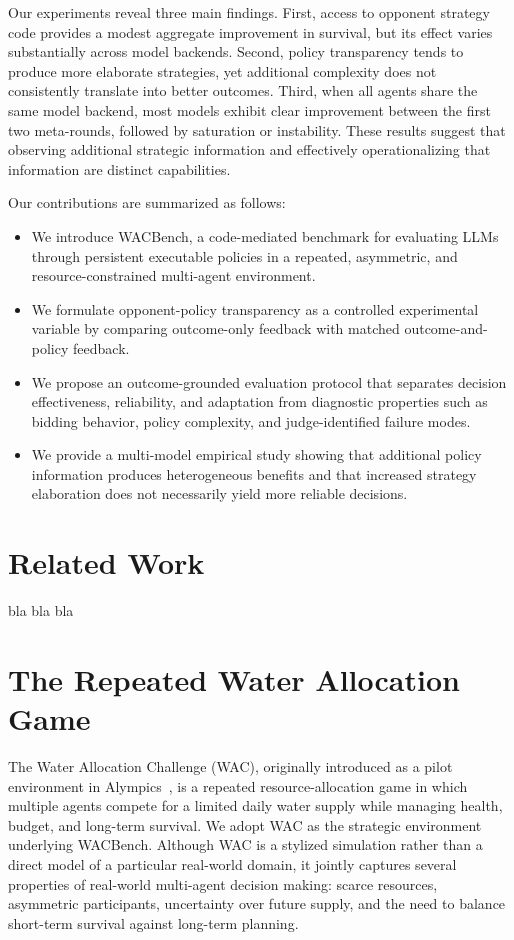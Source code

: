 \documentclass[letterpaper]{article} %
\begin{document}
Our experiments reveal three main findings. First, access to opponent strategy code provides a modest aggregate improvement in survival, but its effect varies substantially across model backends. Second, policy transparency tends to produce more elaborate strategies, yet additional complexity does not consistently translate into better outcomes. Third, when all agents share the same model backend, most models exhibit clear improvement between the first two meta-rounds, followed by saturation or instability. These results suggest that observing additional strategic information and effectively operationalizing that information are distinct capabilities.

Our contributions are summarized as follows:

\begin{itemize}
    \item We introduce WACBench, a code-mediated benchmark for evaluating LLMs through persistent executable policies in a repeated, asymmetric, and resource-constrained multi-agent environment.
    
    \item We formulate opponent-policy transparency as a controlled experimental variable by comparing outcome-only feedback with matched outcome-and-policy feedback.
    
    \item We propose an outcome-grounded evaluation protocol that separates decision effectiveness, reliability, and adaptation from diagnostic properties such as bidding behavior, policy complexity, and judge-identified failure modes.
    
    \item We provide a multi-model empirical study showing that additional policy information produces heterogeneous benefits and that increased strategy elaboration does not necessarily yield more reliable decisions.
\end{itemize}
\section{Related Work}

bla bla bla
\section{The Repeated Water Allocation Game}
The Water Allocation Challenge (WAC), originally introduced
as a pilot environment in Alympics~\cite{mao2025alympics},
is a repeated resource-allocation game in which multiple agents compete for a limited daily water supply while managing health, budget, and long-term survival. We adopt WAC as the strategic environment underlying WACBench. Although WAC is a stylized simulation rather than a direct model of a particular real-world domain, it jointly captures several properties of real-world multi-agent decision making: scarce resources, asymmetric participants, uncertainty over future supply, and the need to balance short-term survival against long-term planning.
\end{document}
